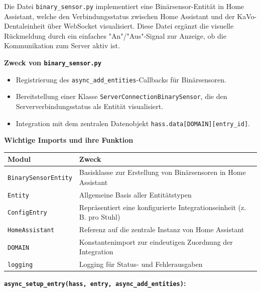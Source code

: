 Die Datei \texttt{binary\_sensor.py} implementiert eine Binärsensor-Entität in Home Assistant, welche den Verbindungsstatus zwischen Home Assistant und der KaVo-Dentaleinheit über WebSocket visualisiert. Diese Datei ergänzt die visuelle Rückmeldung durch ein einfaches "An"/"Aus"-Signal zur Anzeige, ob die Kommunikation zum Server aktiv ist.

\vspace{0.5cm}

\textbf{Zweck von \texttt{binary\_sensor.py}}

\begin{itemize}
  \item Registrierung des \texttt{async\_add\_entities}-Callbacks für Binärsensoren.\\
  \item Bereitstellung einer Klasse \texttt{ServerConnectionBinarySensor}, die den Serververbindungsstatus als Entität visualisiert.\\
  \item Integration mit dem zentralen Datenobjekt \texttt{hass.data[DOMAIN][entry\_id]}.
\end{itemize}

\vspace{0.5cm}

\textbf{Wichtige Imports und ihre Funktion}

\begin{tabular}{|p{5.5cm}|p{8.5cm}|}
\hline
\textbf{Modul} & \textbf{Zweck} \\
\hline
\texttt{BinarySensorEntity} & Basisklasse zur Erstellung von Binärsensoren in Home Assistant \\
\texttt{Entity} & Allgemeine Basis aller Entitätstypen \\
\texttt{ConfigEntry} & Repräsentiert eine konfigurierte Integrationseinheit (z.\,B. pro Stuhl) \\
\texttt{HomeAssistant} & Referenz auf die zentrale Instanz von Home Assistant \\
\texttt{DOMAIN} & Konstantenimport zur eindeutigen Zuordnung der Integration \\
\texttt{logging} & Logging für Status- und Fehlerausgaben \\
\hline
\end{tabular}

\vspace{0.5cm}

\textbf{\texttt{async\_setup\_entry(hass, entry, async\_add\_entities)}:}

